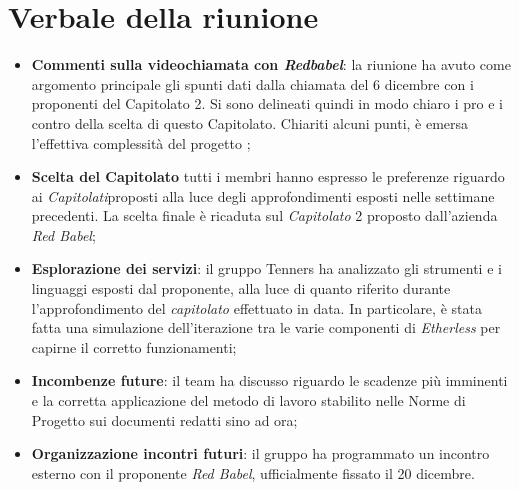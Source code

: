 \section{Verbale della riunione}
	\begin{itemize}
		\item \textbf{Commenti sulla videochiamata con \textit{Redbabel}}:
        la riunione ha avuto come argomento principale gli spunti dati dalla chiamata del 6 dicembre con i proponenti del Capitolato 2. Si sono delineati quindi in modo chiaro i pro e i contro della scelta di questo Capitolato. Chiariti alcuni punti, è emersa l'effettiva complessità del progetto ;
        \item \textbf{Scelta del Capitolato\glos} tutti i membri hanno espresso le preferenze riguardo ai \textit{Capitolati}\glo proposti alla luce degli approfondimenti esposti nelle settimane precedenti. La scelta finale è ricaduta sul \textit{Capitolato\glo} 2 proposto dall'azienda \textit{Red Babel};
		\item \textbf{Esplorazione dei servizi}:
		il gruppo Tenners ha analizzato gli strumenti e i linguaggi esposti dal proponente, alla luce di quanto riferito durante l'approfondimento del \textit{capitolato\glo} effettuato in data. In particolare, è stata fatta una simulazione dell'iterazione tra le varie componenti di \textit{Etherless} per capirne il corretto funzionamenti;
        \item \textbf{Incombenze future}: il team ha discusso riguardo le scadenze più imminenti e la corretta applicazione del metodo di lavoro stabilito nelle Norme di Progetto sui documenti redatti sino ad ora;
		\item \textbf{Organizzazione incontri futuri}: il gruppo ha programmato un incontro esterno con il proponente \textit{Red Babel}, ufficialmente fissato il 20 dicembre.
	\end{itemize}
